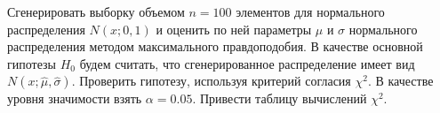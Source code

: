 {Сгенерировать выборку объемом $n = 100$ элементов для нормального распределения $N(x; 0, 1)$ и оценить по ней параметры $\mu$ и $\sigma$ нормального распределения методом максимального правдоподобия. В качестве основной гипотезы $H_0$ будем считать, что сгенерированное распределение имеет вид $N(x; \hat{\mu}, \hat{\sigma})$. Проверить гипотезу, используя критерий согласия $\chi^2$. В качестве уровня значимости взять $\alpha = 0.05$. Привести таблицу вычислений $\chi^2$.}